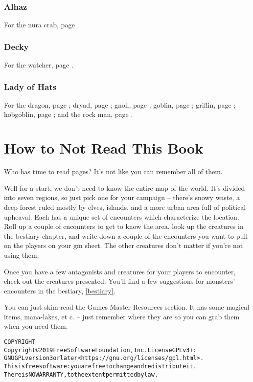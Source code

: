 \begin{multicols}{2}
\subsubsection{Alhaz}

For the nura crab, page \pageref{Alhaz/crab}.

\subsubsection{Decky}

For the watcher, page \pageref{Decky/watcher}.

\subsubsection{Lady of Hats}

For the 
dragon, page \pageref{loh/dragon};
dryad, page \pageref{loh/dryad};
gnoll, page \pageref{loh/gnoll};
goblin, page \pageref{loh/goblin};
griffin, page \pageref{loh/griffin};
hobgoblin, page \pageref{loh/hobgoblin};
and
the rock man, page \pageref{loh/rockman}.

\end{multicols}

\section*{How to Not Read This Book}

\begin{multicols}{2}

\noindent Who has time to read \pageref{lastpage} pages?  It's not like you can remember all of them.

Well for a start, we don't need to know the entire map of the world.
It's divided into seven regions, so just pick one for your campaign -- there's snowy waste, a deep forest ruled mostly by elves, islands, and a more urban area full of political upheaval.
Each has a unique set of encounters which characterize the location.
Roll up a couple of encounters to get to know the area, look up the creatures in the bestiary chapter, and write down a couple of the encounters you want to pull on the players on your \gls{gm} sheet.
The other creatures don't matter if you're not using them.

Once you have a few antagonists and creatures for your players to encounter, check out the creatures presented.
You'll find a few suggestions for monsters' encounters in the bestiary, \autoref{bestiary}.

You can just skim-read the Games Master Resources section.
It has some magical items, mana-lakes, et c. -- just remember where they are so you can grab them when you need them.

\end{multicols}

\begin{alltt}
COPYRIGHT
       Copyright \copyright 2019 Free Software Foundation, Inc.  License GPLv3+:
  GNU GPL version 3 or later <https://gnu.org/licenses/gpl.html>.
       This is free software: you are free to change and redistribute it.
  There is NO WARRANTY, to the extent permitted by law.

\end{alltt}
